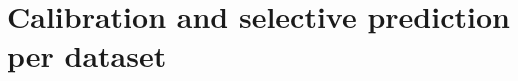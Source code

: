 \documentclass[table]{article}
\begin{document}



\appendix
\section{Calibration and selective prediction per dataset}

\begin{table}[h]
\centering
\caption{Choice datasets: accuracy, ECE of the top-option probability, accuracy on the 80\% and 50\% most confident examples (ranked by Jev's confidence), and area under the risk--coverage curve.}
\label{tab:calibration}
\footnotesize
\setlength{\tabcolsep}{4pt}

\end{table}
\end{document}
